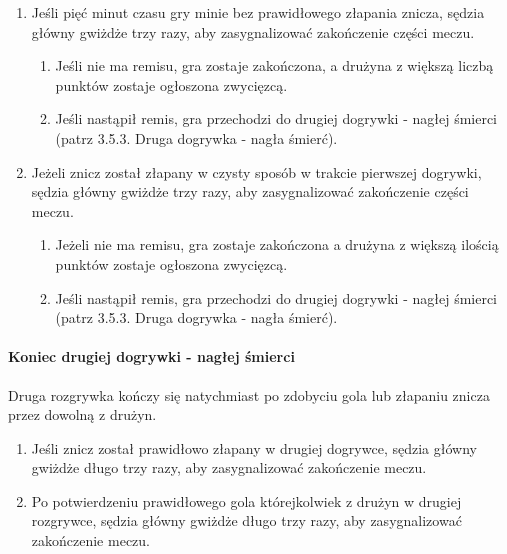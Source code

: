 \documentclass[12pt]{article}
\begin{document}
\begin{enumerate}
	\item Jeśli pięć minut czasu gry minie bez prawidłowego złapania znicza,
	      sędzia główny gwiżdże trzy razy, aby zasygnalizować zakończenie części
	      meczu.
	      \begin{enumerate}
		      \item Jeśli nie ma remisu, gra zostaje zakończona, a drużyna z większą
		            liczbą punktów zostaje ogłoszona zwycięzcą.

		      \item Jeśli nastąpił remis, gra przechodzi do drugiej dogrywki - nagłej
		            śmierci (patrz 3.5.3. Druga dogrywka - nagła śmierć).
	      \end{enumerate}

	\item Jeżeli znicz został złapany w czysty sposób w trakcie pierwszej
	      dogrywki, sędzia główny gwiżdże trzy razy, aby zasygnalizować
	      zakończenie części meczu.
	      \begin{enumerate}
		      \item Jeżeli nie ma remisu, gra zostaje zakończona a drużyna z większą
		            ilością punktów zostaje
		            ogłoszona zwycięzcą.

		      \item Jeśli nastąpił remis, gra przechodzi do drugiej dogrywki - nagłej
		            śmierci (patrz 3.5.3. Druga dogrywka - nagła śmierć).
	      \end{enumerate}
\end{enumerate}

\paragraph{Koniec drugiej dogrywki - nagłej śmierci}
Druga
rozgrywka kończy się natychmiast po zdobyciu gola lub złapaniu znicza
przez dowolną z drużyn.

\begin{enumerate}
	\item Jeśli znicz został prawidłowo złapany w drugiej dogrywce, sędzia
	      główny gwiżdże długo trzy razy, aby zasygnalizować zakończenie meczu.

	\item Po potwierdzeniu prawidłowego gola którejkolwiek z drużyn w drugiej
	      rozgrywce, sędzia główny gwiżdże długo trzy razy, aby zasygnalizować
	      zakończenie meczu.
\end{enumerate}
\end{document}
